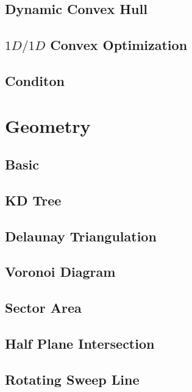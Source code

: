 \documentclass[a4paper,10pt,twocolumn,oneside]{article}
\begin{document}
\subsection{Dynamic Convex Hull}

\subsection{$1D/1D$ Convex Optimization}

\subsection{Conditon}

\section{Geometry}
\subsection{Basic}

\subsection{KD Tree}

\subsection{Delaunay Triangulation}

\subsection{Voronoi Diagram}

\subsection{Sector Area}

% 
\subsection{Half Plane Intersection}

\subsection{Rotating Sweep Line}

\end{document}
